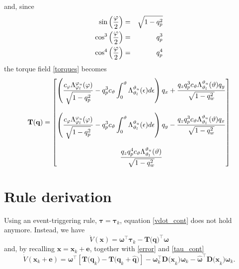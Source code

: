 \documentclass{article}
\begin{document}
		 	and, since 
		 	\begin{eqnarray*}
			 	\sin \left(\displaystyle \displaystyle \frac{\varphi}{2} \right) &=& \sqrt{1-q_p^2}\\
			 	\cos^3 \left(\displaystyle\displaystyle \frac{\varphi}{2} \right) &=& q_p^3\\
			 	\cos^4 \left(\displaystyle\displaystyle \frac{\varphi}{2} \right) &=& q_p^4
		 	\end{eqnarray*}
		 	the torque field \eqref{torques} becomes
		 	\begin{equation}
		 		\mathbf{T(q)} = \begin{bmatrix}
		 					\displaystyle \left ( \displaystyle \frac{c_\varphi \Lambda_{\varphi_l}^{\varphi_u}(\varphi)}{\sqrt{1-q_p^2}} - q_p^3 c_\vartheta \int_0^\vartheta{\Lambda_{\vartheta_l}^{\vartheta_u}(\epsilon)} d\epsilon \right ) q_x + \displaystyle \frac{q_z q_p^3 c_\vartheta \Lambda_{\vartheta_l}^{\vartheta_u}(\vartheta) q_y}{\sqrt{1-q_w^2}}\\ \\
		 					\displaystyle \left ( \displaystyle \frac{c_\varphi \Lambda_{\varphi_l}^{\varphi_u}(\varphi)}{\sqrt{1-q_p^2}} - q_p^3 c_\vartheta \int_0^\vartheta{\Lambda_{\vartheta_l}^{\vartheta_u}(\epsilon)} d\epsilon \right ) q_y - \displaystyle \frac{q_z q_p^3 c_\vartheta \Lambda_{\vartheta_l}^{\vartheta_u}(\vartheta) q_x}{\sqrt{1-q_w^2}}\\ \\
							\displaystyle \displaystyle \frac{q_z q_p^4 c_\vartheta \Lambda_{\vartheta_l}^{\vartheta_u}(\vartheta)}{\sqrt{1-q_w^2}}	 		
		 				\end{bmatrix}
		 		\label{torques_vec}
		 	\end{equation}

	\section{Rule derivation}
		Using an event-triggering rule, $\boldsymbol \tau = \boldsymbol \tau_k$, equation \eqref{vdot_cont} does not hold anymore. Instead, we have
		\[
			\dot V(\mathbf{x}) = \boldsymbol \omega^\top \boldsymbol \tau_k - \mathbf{T(q})^\top\boldsymbol \omega
		\]
		and, by recalling $\mathbf{x} = \mathbf{x}_k + \mathbf{e}$, together with \eqref{error} and \eqref{tau_cont}
		\[
			\dot V(\mathbf{x}_k+\mathbf{e}) = \boldsymbol \omega^\top \left [ \mathbf{T(q}_k) - \mathbf{T(q}_k + \mathbf{\hat{q}}) \right ] - \boldsymbol \omega_k^\top \mathbf{D(x}_k) \boldsymbol \omega_k -  \hat{\boldsymbol \omega}^\top \mathbf{D(x}_k) \boldsymbol \omega_k.
		\]
		
\end{document}
